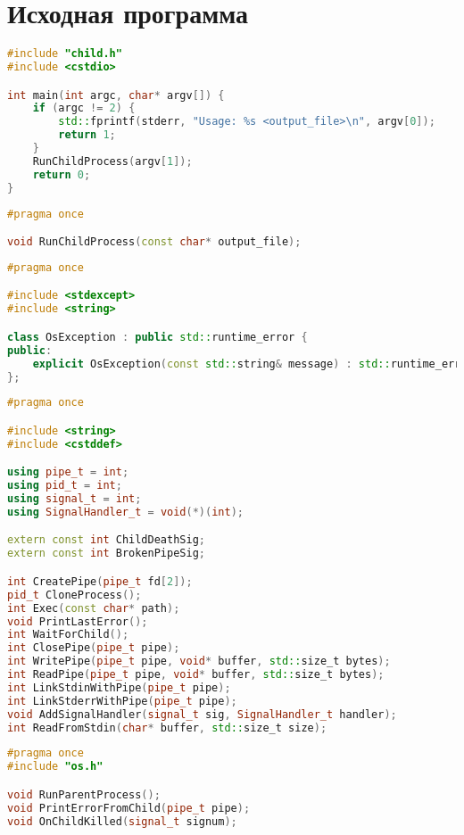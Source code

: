 \section{Исходная программа}

\begin{lstlisting}[language=C++,caption=bin/child.cpp,captionpos=b]
#include "child.h"
#include <cstdio>

int main(int argc, char* argv[]) {
    if (argc != 2) {
        std::fprintf(stderr, "Usage: %s <output_file>\n", argv[0]);
        return 1;
    }
    RunChildProcess(argv[1]);
    return 0;
}
\end{lstlisting}

\begin{lstlisting}[language=C++,caption=child.h,captionpos=b]
#pragma once

void RunChildProcess(const char* output_file);
\end{lstlisting}

\begin{lstlisting}[language=C++,caption=exceptions.h,captionpos=b]
#pragma once

#include <stdexcept>
#include <string>

class OsException : public std::runtime_error {
public:
    explicit OsException(const std::string& message) : std::runtime_error(message) {}
};
\end{lstlisting}

\begin{lstlisting}[language=C++,caption=os.h,captionpos=b]
#pragma once

#include <string>
#include <cstddef>

using pipe_t = int;
using pid_t = int;
using signal_t = int;
using SignalHandler_t = void(*)(int);

extern const int ChildDeathSig;
extern const int BrokenPipeSig;

int CreatePipe(pipe_t fd[2]);
pid_t CloneProcess();
int Exec(const char* path);
void PrintLastError();
int WaitForChild();
int ClosePipe(pipe_t pipe);
int WritePipe(pipe_t pipe, void* buffer, std::size_t bytes);
int ReadPipe(pipe_t pipe, void* buffer, std::size_t bytes);
int LinkStdinWithPipe(pipe_t pipe);
int LinkStderrWithPipe(pipe_t pipe);
void AddSignalHandler(signal_t sig, SignalHandler_t handler);
int ReadFromStdin(char* buffer, std::size_t size);
\end{lstlisting}

\begin{lstlisting}[language=C++,caption=parent.h,captionpos=b]
#pragma once
#include "os.h"

void RunParentProcess();
void PrintErrorFromChild(pipe_t pipe);
void OnChildKilled(signal_t signum);
\end{lstlisting}

